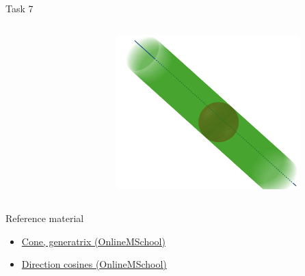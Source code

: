 \documentclass[aspectratio=169]{beamer}
\newcommand{\fbckg}[1]{\usebackgroundtemplate{\texttt{[image: \#1]}}}%
\begin{document}
\begin{frame}[t]{Task 7}
{\begin{columns}[T,onlytextwidth]
\begin{column}{0.59\textwidth}
            \end{column}
            \begin{column}{0.39\textwidth}
                \vspace{-0.6cm}
                \begin{figure}[H]
                    \href{https://www.geogebra.org/calculator/uqzwjqu6}{
                        \centering\includegraphics[height=6cm,width=1\textwidth,keepaspectratio]{7ans.png}}
                    \label{fig:7ans.png}
                \end{figure}
            \end{column}
        \end{columns}
    }
\end{frame}
\begin{frame}[t]{Reference material}
    \Large
    \begin{itemize}
        \item \href{https://onlinemschool.com/math/formula/cone/}{Cone, generatrix (OnlineMSchool)}
        \item \href{https://onlinemschool.com/math/library/vector/cos/}{Direction cosines (OnlineMSchool)}
    \end{itemize}
\end{frame}

\fbckg{fibeamer/figs/last_page.png}
\frame[plain]{}
\end{document}
